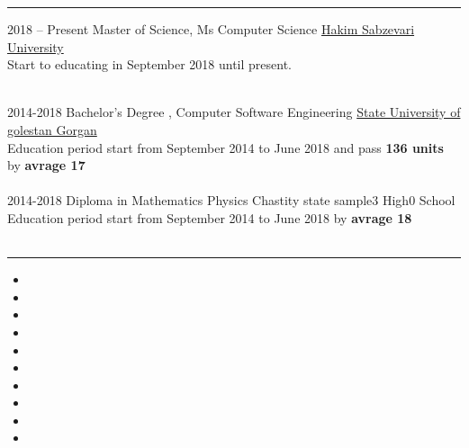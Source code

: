 \documentclass[8pt]{developercv}
\begin{document}
\noindent\rule{\textwidth}{1pt}
\vspace{-\baselineskip} 



\vspace{5pt} 

\begin{entrylist}
	\entry
	{2018 -- Present}
	{Master of Science, Ms Computer Science}
	{\href{http://www.hsu.ac.ir/en/}{Hakim Sabzevari University\\}}
	{Start to educating in September 2018 until present.\\\\}

	\entry
	{2014-2018}
	{Bachelor's Degree , Computer Software Engineering}
	{\href{http://gu.ac.ir/}{State University of golestan Gorgan\\}}
	{Education period start from September 2014 to June 2018 and pass \textbf{136 units} by \textbf{avrage 17}\\\\}
\entry
	{2014-2018}
	{Diploma in Mathematics Physics}
	{Chastity state sample3 High0 School\\}
	{Education period start from September 2014 to June 2018 by \textbf{avrage 18}\\\\}

\end{entrylist}


\vspace{35pt} 
\noindent\rule{\textwidth}{1pt}


\vspace{10pt} 

\begin{minipage}[t]{0.6\textwidth}

	\begin{itemize}

		\item {}
		\item {}
		\item {}
		\item {}
		\item {}
		\item {}
		\item {}
		\item {}
		\item {}
		\item {}
	\end{itemize}



\end{minipage}
\end{document}

